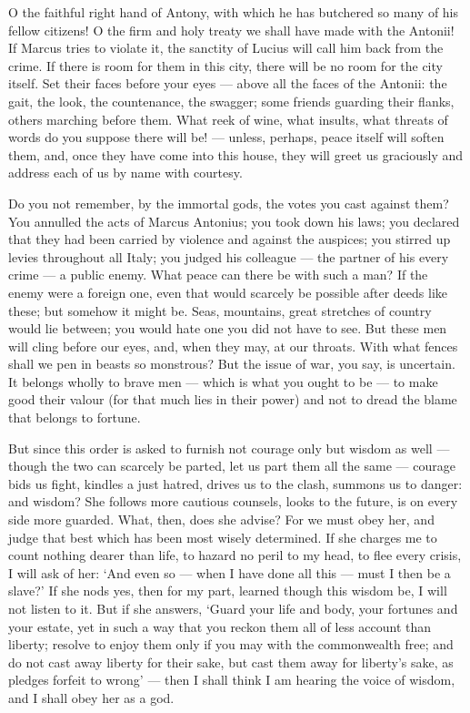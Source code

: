  O the faithful right hand of Antony, with which he has butchered so many of his fellow citizens! O the firm and holy treaty we shall have made with the Antonii! If Marcus tries to violate it, the sanctity of Lucius will call him back from the crime. If there is room for them in this city, there will be no room for the city itself. Set their faces before your eyes --- above all the faces of the Antonii: the gait, the look, the countenance, the swagger; some friends guarding their flanks, others marching before them. What reek of wine, what insults, what threats of words do you suppose there will be! --- unless, perhaps, peace itself will soften them, and, once they have come into this house, they will greet us graciously and address each of us by name with courtesy.

 Do you not remember, by the immortal gods, the votes you cast against them? You annulled the acts of Marcus Antonius; you took down his laws; you declared that they had been carried by violence and against the auspices; you stirred up levies throughout all Italy; you judged his colleague --- the partner of his every crime --- a public enemy. What peace can there be with such a man? If the enemy were a foreign one, even that would scarcely be possible after deeds like these; but somehow it might be. Seas, mountains, great stretches of country would lie between; you would hate one you did not have to see. But these men will cling before our eyes, and, when they may, at our throats. With what fences shall we pen in beasts so monstrous? But the issue of war, you say, is uncertain. It belongs wholly to brave men --- which is what you ought to be --- to make good their valour (for that much lies in their power) and not to dread the blame that belongs to fortune.

 But since this order is asked to furnish not courage only but wisdom as well --- though the two can scarcely be parted, let us part them all the same --- courage bids us fight, kindles a just hatred, drives us to the clash, summons us to danger: and wisdom? She follows more cautious counsels, looks to the future, is on every side more guarded. What, then, does she advise? For we must obey her, and judge that best which has been most wisely determined. If she charges me to count nothing dearer than life, to hazard no peril to my head, to flee every crisis, I will ask of her: `And even so --- when I have done all this --- must I then be a slave?' If she nods yes, then for my part, learned though this wisdom be, I will not listen to it. But if she answers, `Guard your life and body, your fortunes and your estate, yet in such a way that you reckon them all of less account than liberty; resolve to enjoy them only if you may with the commonwealth free; and do not cast away liberty for their sake, but cast them away for liberty's sake, as pledges forfeit to wrong' --- then I shall think I am hearing the voice of wisdom, and I shall obey her as a god.

